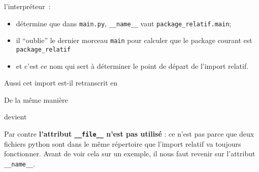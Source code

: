 \begin{Shaded}
\begin{Highlighting}[frame=lines,framerule=0.6mm,rulecolor=\color{asisframecolor}]
\end{Highlighting}
\end{Shaded}

l'interpréteur~:

\begin{itemize}
\tightlist
\item
  détermine que dans \texttt{main.py}, \texttt{\_\_name\_\_} vaut
  \texttt{package\_relatif.main};
\item
  il ``oublie'' le dernier morceau \texttt{main} pour calculer que le
  package courant est \texttt{package\_relatif}
\item
  et c'est ce nom qui sert à déterminer le point de départ de l'import
  relatif.
\end{itemize}

Aussi cet import est-il retranscrit en

\begin{Shaded}
\begin{Highlighting}[frame=lines,framerule=0.6mm,rulecolor=\color{asisframecolor}]
\end{Highlighting}
\end{Shaded}

    De la même manière

\begin{Shaded}
\begin{Highlighting}[frame=lines,framerule=0.6mm,rulecolor=\color{asisframecolor}]
\end{Highlighting}
\end{Shaded}

devient

\begin{Shaded}
\begin{Highlighting}[frame=lines,framerule=0.6mm,rulecolor=\color{asisframecolor}]
\end{Highlighting}
\end{Shaded}

    Par contre \textbf{l'attribut \texttt{\_\_file\_\_} n'est pas utilisé} :
ce n'est pas parce que deux fichiers python sont dans le même répertoire
que l'import relatif va toujours fonctionner. Avant de voir cela sur un
exemple, il nous faut revenir sur l'attribut \texttt{\_\_name\_\_}.

